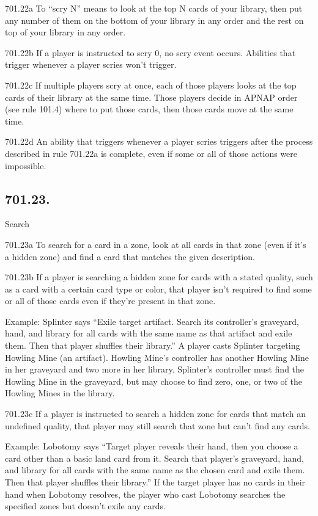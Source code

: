 701.22a To “scry N” means to look at the top N cards of your library, then put any number of them on the bottom of your library in any order and the rest on top of your library in any order.

701.22b If a player is instructed to scry 0, no scry event occurs. Abilities that trigger whenever a player scries won’t trigger.

701.22c If multiple players scry at once, each of those players looks at the top cards of their library at the same time. Those players decide in APNAP order (see rule 101.4) where to put those cards, then those cards move at the same time.

701.22d An ability that triggers whenever a player scries triggers after the process described in rule 701.22a is complete, even if some or all of those actions were impossible.

\subsection*{701.23.}
Search

701.23a To search for a card in a zone, look at all cards in that zone (even if it’s a hidden zone) and find a card that matches the given description.

701.23b If a player is searching a hidden zone for cards with a stated quality, such as a card with a certain card type or color, that player isn’t required to find some or all of those cards even if they’re present in that zone.

Example: Splinter says “Exile target artifact. Search its controller’s graveyard, hand, and library for all cards with the same name as that artifact and exile them. Then that player shuffles their library.” A player casts Splinter targeting Howling Mine (an artifact). Howling Mine’s controller has another Howling Mine in her graveyard and two more in her library. Splinter’s controller must find the Howling Mine in the graveyard, but may choose to find zero, one, or two of the Howling Mines in the library.

701.23c If a player is instructed to search a hidden zone for cards that match an undefined quality, that player may still search that zone but can’t find any cards.

Example: Lobotomy says “Target player reveals their hand, then you choose a card other than a basic land card from it. Search that player’s graveyard, hand, and library for all cards with the same name as the chosen card and exile them. Then that player shuffles their library.” If the target player has no cards in their hand when Lobotomy resolves, the player who cast Lobotomy searches the specified zones but doesn’t exile any cards.

